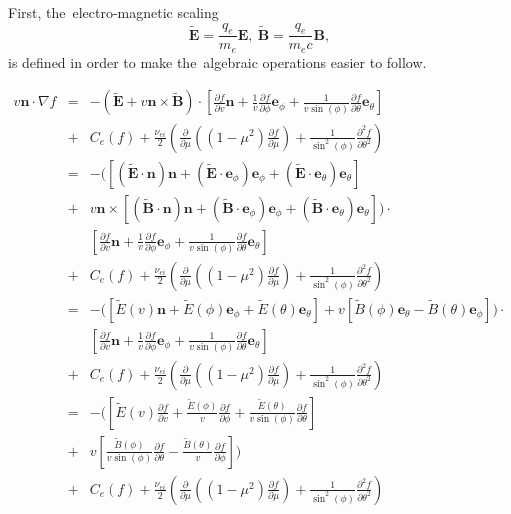 \documentclass[review]{elsarticle}
\newcommand{\pdv}[2]{\frac{\partial{#1}}{\partial{#2}}}
\newcommand{\vect}[1]{\boldsymbol{#1}}
\newcommand{\vmag}{v}
\newcommand{\vn}{\vect{n}}
\newcommand{\E}{\vect{E}}
\newcommand{\B}{\vect{B}}
\newcommand{\tE}{\vect{\tilde{E}}}
\newcommand{\tB}{\vect{\tilde{B}}}
\newcommand{\qe}{q_e}
\newcommand{\me}{m_e}
\begin{document}
First, the~electro-magnetic scaling
\begin{equation}
  \tE = \frac{\qe}{\me}\E,~\tB = \frac{\qe}{\me c} \B,
\end{equation}
is defined in order to make the~algebraic operations easier to follow.

\begin{eqnarray}
  \vmag\vn\cdot\nabla f 
  &=& - \left(\tE + \vmag\vn\times\tB\right)\cdot
  \left[ \pdv{f}{\vmag}\vn 
  + \frac{1}{\vmag}\pdv{f}{\phi}\vect{e}_\phi
  + \frac{1}{\vmag\sin(\phi)}\pdv{f}{\theta}\vect{e}_{\theta} \right] 
  \nonumber \\
  &+& C_e(f) 
  + \frac{\nu_{ei}}{2} 
  \left(\pdv{}{\mu}\left((1 - \mu^2)\pdv{f}{\mu}\right)
  + \frac{1}{\sin^2(\phi)}\frac{\partial^2f}{\partial\theta^2} \right) 
  \nonumber \\
  &=& - \Big(
  \left[\left(\tE\cdot\vn\right)\vn 
  + \left(\tE\cdot\vect{e}_\phi\right)\vect{e}_\phi
  + \left(\tE\cdot\vect{e}_\theta\right)\vect{e}_\theta \right] 
  \nonumber \\
  &+& \vmag\vn\times
  \left[\left(\tB\cdot\vn\right)\vn 
  + \left(\tB\cdot\vect{e}_\phi\right)\vect{e}_\phi
  + \left(\tB\cdot\vect{e}_\theta\right)\vect{e}_\theta \right] \Big)\cdot 
  \nonumber \\
  && \left[ \pdv{f}{\vmag}\vn 
  + \frac{1}{\vmag}\pdv{f}{\phi}\vect{e}_\phi
  + \frac{1}{\vmag\sin(\phi)}\pdv{f}{\theta}\vect{e}_{\theta} \right] 
  \nonumber \\
  &+& C_e(f)
  + \frac{\nu_{ei}}{2} 
  \left(\pdv{}{\mu}\left((1 - \mu^2)\pdv{f}{\mu}\right)
  + \frac{1}{\sin^2(\phi)}\frac{\partial^2f}{\partial\theta^2} \right) 
  \nonumber \\ 
  &=& - \Big(
  \left[\tilde{E}(\vmag)\vn 
  + \tilde{E}(\phi)\vect{e}_\phi
  + \tilde{E}(\theta)\vect{e}_\theta \right] 
  + \vmag
  \left[\tilde{B}(\phi)\vect{e}_\theta 
  - \tilde{B}(\theta)\vect{e}_\phi \right] \Big)\cdot 
  \nonumber \\
  && \left[ \pdv{f}{\vmag}\vn 
  + \frac{1}{\vmag}\pdv{f}{\phi}\vect{e}_\phi
  + \frac{1}{\vmag\sin(\phi)}\pdv{f}{\theta}\vect{e}_{\theta} \right] 
  \nonumber \\
  &+& C_e(f)
  + \frac{\nu_{ei}}{2} 
  \left(\pdv{}{\mu}\left((1 - \mu^2)\pdv{f}{\mu}\right)
  + \frac{1}{\sin^2(\phi)}\frac{\partial^2f}{\partial\theta^2} \right)
  \nonumber \\
  &=& - \Bigg(
  \left[ \tilde{E}(\vmag)\pdv{f}{\vmag} 
  + \frac{\tilde{E}(\phi)}{\vmag}\pdv{f}{\phi}
  + \frac{\tilde{E}(\theta)}{\vmag\sin(\phi)}\pdv{f}{\theta} \right]
  \nonumber \\ 
  &+& \vmag
  \left[\frac{\tilde{B}(\phi)}{\vmag\sin(\phi)}\pdv{f}{\theta}
  - \frac{\tilde{B}(\theta)}{\vmag}\pdv{f}{\phi} \right] \Bigg)
  \nonumber \\
  &+& C_e(f) 
  + \frac{\nu_{ei}}{2} 
  \left(\pdv{}{\mu}\left((1 - \mu^2)\pdv{f}{\mu}\right)
  + \frac{1}{\sin^2(\phi)}\frac{\partial^2f}{\partial\theta^2} \right)
  \label{eq:BGK_spherical_definition}
\end{eqnarray}
\end{document}
